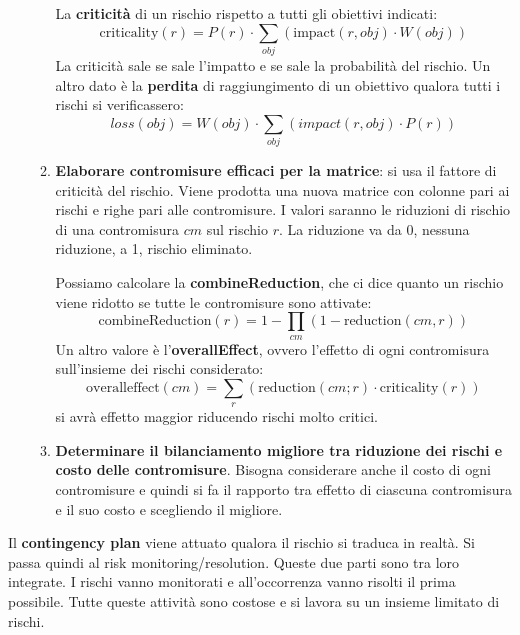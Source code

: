 \begin{enumerate}
\begin{enumerate}
                    La \textbf{criticità} di un rischio rispetto a tutti gli
                    obiettivi indicati:
                    \begin{equation}
                        \text{criticality}(r) = P(r) \cdot \sum_{obj}
                        (\text{impact}(r, obj) \cdot W(obj))
                    \end{equation}
                    La criticità sale se sale l'impatto e se sale la probabilità
                    del rischio. Un altro dato è la \textbf{perdita} di raggiungimento
                    di un obiettivo qualora tutti i rischi si verificassero:
                    \begin{equation}
                        loss(obj) = W(obj) \cdot \sum_{obj} (impact(r, obj) \cdot P(r))
                    \end{equation}
              \item \textbf{Elaborare contromisure efficaci per la matrice}: si usa il
                    fattore di criticità del rischio. Viene prodotta una nuova
                    matrice con colonne pari ai rischi e righe pari alle contromisure.
                    I valori saranno le riduzioni di rischio di una contromisura
                    $cm$ sul rischio $r$. La riduzione va da 0, nessuna riduzione,
                    a 1, rischio eliminato.

                    Possiamo calcolare la \textbf{combineReduction}, che ci dice
                    quanto un rischio viene ridotto se tutte le contromisure sono
                    attivate:
                    \begin{equation}
                        \text{combineReduction}(r) = 1 - \prod_{cm}(1 -
                        \text{reduction}(cm, r))
                    \end{equation}
                    Un altro valore è l'\textbf{overallEffect}, ovvero l'effetto
                    di ogni contromisura sull'insieme dei rischi considerato:
                    \begin{equation}
                        \text{overalleffect}(cm) = \sum_{r} (\text{reduction}(cm; r)
                        \cdot \text{criticality}(r))
                    \end{equation}
                    si avrà effetto maggior riducendo rischi molto critici.
              \item \textbf{Determinare il bilanciamento migliore tra riduzione
                        dei rischi e costo delle contromisure}.
                    Bisogna considerare anche il costo di ogni contromisure e
                    quindi si fa il rapporto tra effetto di ciascuna contromisura
                    e il suo costo e scegliendo il migliore.
          \end{enumerate}
\end{enumerate}
Il \textbf{contingency plan} viene attuato qualora il rischio si traduca in realtà.
Si passa quindi al risk monitoring/resolution. Queste due parti sono tra loro
integrate. I rischi vanno monitorati e all'occorrenza vanno risolti il prima possibile.
Tutte queste attività sono costose e si lavora su un insieme limitato di rischi.